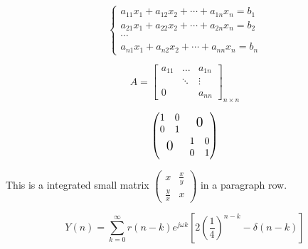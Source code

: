 \documentclass[10pt,journal,compsoc]{IEEEtran}
\begin{document}
	\begin{equation}
	\left\{
	\begin{array}{c}
	a_{11}x_1+a_{12}x_2+\cdots+a_{1n}x_n=b_1 \\
	a_{21}x_1+a_{22}x_2+\cdots+a_{2n}x_n=b_2 \\
	\cdots \\
	a_{n1}x_1+a_{n2}x_2+\cdots+a_{nn}x_n=b_n
	\end{array}
	\right.
	\end{equation}

	\[
	A=\begin{bmatrix}
	a_{11} & \dots & a_{1n}\\
	& \ddots & \vdots\\
	0 & & a_{nn}
	\end{bmatrix}_{n \times n}
	\]

	\[
	\begin{pmatrix}
	\begin{matrix} 1&0\\0&1 \end{matrix} & \text{\Large 0}\\
	\text{\Large 0} & \begin{matrix} 1&0\\0&1 \end{matrix}
	\end{pmatrix}
	\]

	This is a integrated small matrix
	\begin{math}
	\left(
	\begin{smallmatrix}
	x & \frac{x}{y} \\
	\frac{y}{x} & x
	\end{smallmatrix}
	\right)
	\end{math} in a paragraph row.

	\begin{equation}
	Y(n) = \sum\limits_{k=0}^\infty r(n-k)e^{j\omega k}[2 (\frac{1}{4})^{n-k}-\delta(n-k)]
	\end{equation}
	
\end{document}
